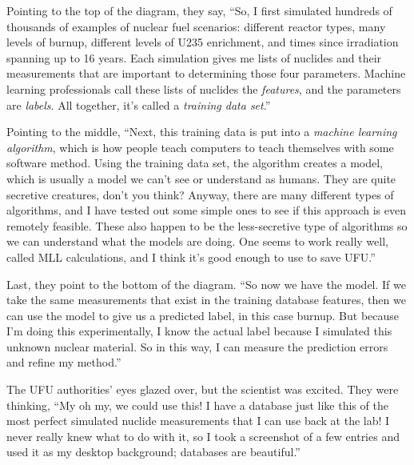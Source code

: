 {\begin{shadequote}
  Pointing to the top of the diagram, they say, ``So, I first simulated hundreds
  of thousands of examples of nuclear fuel scenarios: different reactor types,
  many levels of burnup, different levels of \gls{U235} enrichment, and times
  since irradiation spanning up to 16 years.  Each simulation gives me lists of
  nuclides and their measurements that are important to determining those four
  parameters.  Machine learning professionals call these lists of nuclides the
  \textit{features}, and the parameters are \textit{labels}. All together, it's
  called a \textit{training data set}.''
  
  Pointing to the middle, ``Next, this training data is put into a
  \textit{machine learning algorithm}\footnotemark[5], which is how people
  teach computers to teach themselves with some software method. Using the
  training data set, the algorithm creates a model, which is usually a model we
  can't see or understand as humans. They are quite secretive creatures, don't
  you think?  Anyway, there are many different types of algorithms, and I have
  tested out some simple ones to see if this approach is even remotely
  feasible. These also happen to be the less-secretive type of algorithms so we
  can understand what the models are doing. One seems to work really well,
  called \gls{MLL} calculations\footnotemark[6], and I think it's good enough
  to use to save UFU.''

  Last, they point to the bottom of the diagram. ``So now we have the model. If
  we take the same measurements that exist in the training database features,
  then we can use the model to give us a predicted label, in this case burnup.
  But because I'm doing this experimentally, I know the actual label because I
  simulated this unknown nuclear material. So in this way, I can measure the
  prediction errors and refine my method.''
  
  The UFU authorities' eyes glazed over, but the scientist was excited. They
  were thinking, ``My oh my, we could use this! I have a database just like this
  of the most perfect simulated nuclide measurements that I can use back at the
  lab! I never really knew what to do with it, so I took a screenshot of a few
  entries and used it as my desktop background; databases are beautiful.''
  

\end{shadequote}}

